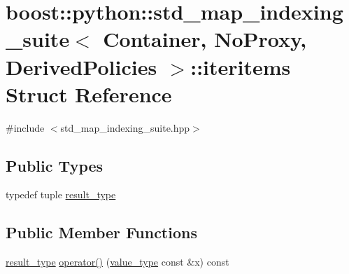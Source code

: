 \hypertarget{structboost_1_1python_1_1std__map__indexing__suite_1_1iteritems}{\section{boost\-:\-:python\-:\-:std\-\_\-map\-\_\-indexing\-\_\-suite$<$ Container, No\-Proxy, Derived\-Policies $>$\-:\-:iteritems Struct Reference}
\label{structboost_1_1python_1_1std__map__indexing__suite_1_1iteritems}
}


{\ttfamily \#include $<$std\-\_\-map\-\_\-indexing\-\_\-suite.\-hpp$>$}

\subsection*{Public Types}
\begin{DoxyCompactItemize}
\item 
typedef tuple \hyperlink{structboost_1_1python_1_1std__map__indexing__suite_1_1iteritems_a97f1c788acd4c665fba8ae1fcc946a45}{result\-\_\-type}
\end{DoxyCompactItemize}
\subsection*{Public Member Functions}
\begin{DoxyCompactItemize}
\item 
\hyperlink{structboost_1_1python_1_1std__map__indexing__suite_1_1iteritems_a97f1c788acd4c665fba8ae1fcc946a45}{result\-\_\-type} \hyperlink{structboost_1_1python_1_1std__map__indexing__suite_1_1iteritems_a4adb01be48bc47d6c1636957267fdca2}{operator()} (\hyperlink{classboost_1_1python_1_1std__map__indexing__suite_aff9ed68cf30e805a04a313d92c62ab38}{value\-\_\-type} const \&x) const 
\end{DoxyCompactItemize}


